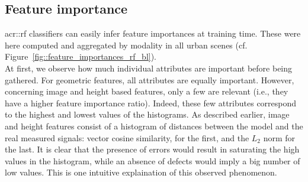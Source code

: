     \subsection{Feature importance}
        \label{subsec::experiments::baseline_feature_analysis::feature_importance}
        \begin{figure}[htpb]
            \centering
        \end{figure}
        
        \gls{acr::rf} classifiers can easily infer feature importances at training time.
        These were here computed and aggregated by modality in all urban scenes (cf. Figure~\ref{fig::feature_importances_rf_bl}).\\

        At first, we observe how much individual attributes are important before being gathered.
        For geometric features, all attributes are equally important.
        However, concerning image and height based features, only a few are relevant (i.e., they have a higher feature importance ratio).
        Indeed, these few attributes correspond to the highest and lowest values of the histograms.
        As described earlier, image and height features consist of a histogram of distances between the model and the real measured signals:
        vector cosine similarity, for the first, and the \(L_2\) norm for the last.
        It is clear that the presence of errors would result in saturating the high values in the histogram, while an absence of defects would imply a big number of low values.
        This is one intuitive explaination of this observed phenomenon.\\
        
